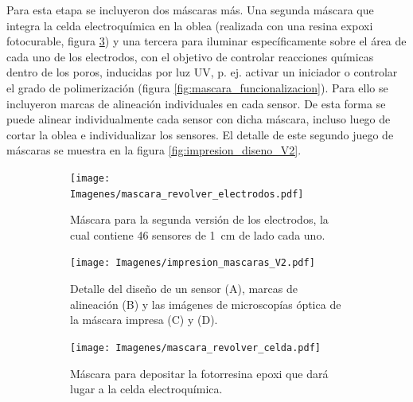 {		     Para esta etapa se incluyeron dos máscaras más. Una segunda máscara que integra la celda electroquímica en la oblea (realizada con una resina expoxi fotocurable, figura \ref{fig:mascara_su8}) y una tercera para iluminar específicamente sobre el área de cada uno de los electrodos, con el objetivo de controlar reacciones químicas dentro de los poros, inducidas por luz UV, p. ej. activar un iniciador o controlar el grado de polimerización  (figura \ref{fig:mascara_funcionalizacion}).\cite{Andrieu-Brunsen2015,Herzog2015,Silies2015} Para ello se incluyeron marcas de alineación individuales en cada sensor. De esta forma se puede alinear individualmente cada sensor con dicha máscara, incluso luego de cortar la oblea e individualizar los sensores. El detalle de este segundo juego de máscaras se muestra en la figura \ref{fig:impresion_diseno_V2}. \vspace*{-0.3cm}
					\begin{figure}[th!]
			 	   	    \centering
			 	   	    \begin{subfigure}[t]{0.495\textwidth}
			        	\texttt{[image: Imagenes/mascara\_revolver\_electrodos.pdf]}
			       		\caption{Máscara para la segunda versión de los electrodos, la cual contiene 46 sensores de \SI{1}{cm} de lado cada uno.}
			         	\label{fig:mascara_v2}
			     		\end{subfigure}
			     		\begin{subfigure}[t]{0.495\textwidth}
			     		\texttt{[image: Imagenes/impresion\_mascaras\_V2.pdf]}
			    		\caption{Detalle del diseño de un sensor (A), marcas de alineación (B) y las imágenes de microscopías óptica de la máscara impresa (C) y (D).}
			    		\label{fig:impresion_diseno_v2_b}	
						\end{subfigure}
			     		\begin{subfigure}[t]{0.495\textwidth}
			         	\texttt{[image: Imagenes/mascara\_revolver\_celda.pdf]}
			        	\caption{Máscara para depositar la fotorresina epoxi que dará lugar a la celda electroquímica.}
			         	\label{fig:mascara_su8}
			     		\end{subfigure}
						\begin{subfigure}[t]{0.495\textwidth}

\end{subfigure}
\end{figure}}
